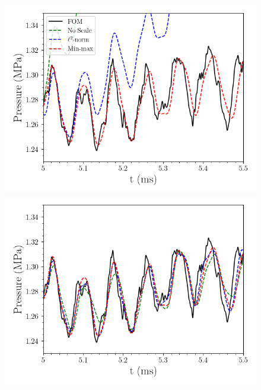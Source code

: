 \begin{figure}
	\begin{minipage}{0.49\linewidth}
		\includegraphics[width=0.99\linewidth]{Chapters/BestPractices/Images/pressure_probe_centScale_centNone.png}
	\end{minipage}
	\begin{minipage}{0.49\linewidth}
		\includegraphics[width=0.99\linewidth]{Chapters/BestPractices/Images/pressure_probe_centScale_centIC.png}
	\end{minipage}
	

\end{figure}
